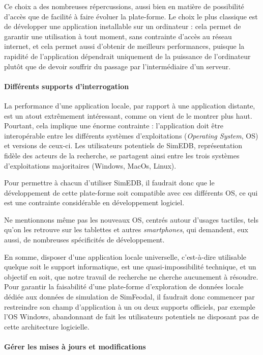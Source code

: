 Ce choix a des nombreuses répercussions, aussi bien en matière de possibilité d'accès que de facilité à faire évoluer la plate-forme.
Le choix le plus classique est de développer une application installable sur un ordinateur : cela permet de garantir une utilisation à tout moment, sans contrainte d'accès au réseau internet, et cela permet aussi d'obtenir de meilleurs performances, puisque la rapidité de l'application dépendrait uniquement de la puissance de l'ordinateur plutôt que de devoir souffrir du passage par l'intermédiaire d'un serveur.

\paragraph*{Différents supports d'interrogation}
La performance d'une application locale, par rapport à une application distante, est un atout extrêmement intéressant, comme on vient de le montrer plus haut.
Pourtant, cela implique une énorme contrainte : l'application doit être interopérable entre les différents systèmes d'exploitations (\textit{Operating System}, OS) et versions de ceux-ci.
Les utilisateurs potentiels de SimEDB, représentation fidèle des acteurs de la recherche, se partagent ainsi entre les trois systèmes d'exploitations majoritaires (Windows, MacOs, Linux).

Pour permettre à chacun d'utiliser SimEDB, il faudrait donc que le développement de cette plate-forme soit compatible avec ces différents OS, ce qui est une contrainte considérable en développement logiciel.

Ne mentionnons même pas les nouveaux OS, centrés autour d'usages tactiles, tels qu'on les retrouve sur les tablettes et autres \textit{smartphones}, qui demandent, eux aussi, de nombreuses spécificités de développement.

En somme, disposer d'une application locale universelle, c'est-à-dire utilisable quelque soit le support informatique, est une quasi-impossibilité technique, et un objectif en soit, que notre travail de recherche ne cherche aucunement à résoudre.
Pour garantir la faisabilité d'une plate-forme d'exploration de données locale dédiée aux données de simulation de SimFeodal, il faudrait donc commencer par restreindre son champ d'application à un ou deux supports officiels, par exemple l'OS Windows, abandonnant de fait les utilisateurs potentiels ne disposant pas de cette architecture logicielle.

\paragraph*{Gérer les mises à jours et modifications}

